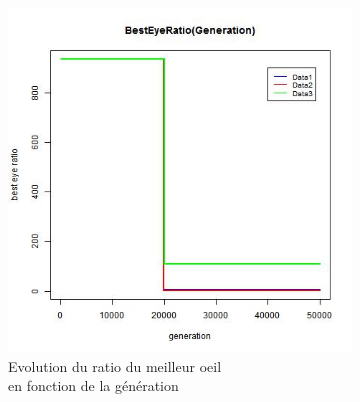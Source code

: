 \documentclass[a4paper,11pt]{article}
\begin{document}
%

\begin{figure}
\centering
\begin{subfigure}{.5\textwidth}
  \centering
\includegraphics[width=1\linewidth]{best_eye_ratio.jpeg}
\caption{Evolution du ratio du meilleur oeil \\en fonction de la génération}
\label{fig:best_7}
\end{subfigure}%
\begin{subfigure}{.5\textwidth}
  \centering

\end{subfigure}
\end{figure}
\end{document}
